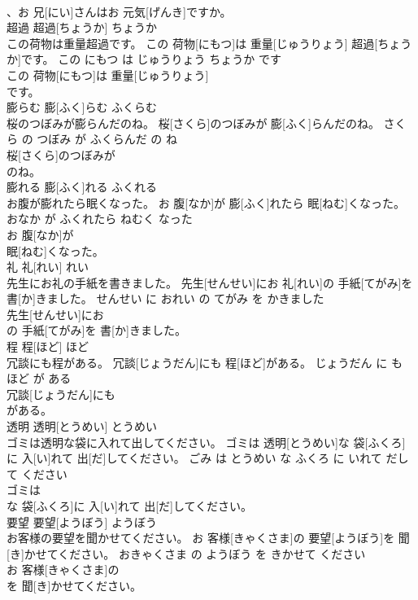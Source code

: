 \documentclass[8pt]{extreport}
\begin{document}
\begin{CJK}{UTF8}{min}
\\	、お 兄[にい]さんはお 元気[げんき]ですか。			
\\	超過	超過[ちょうか]	ちょうか	
\\	この荷物は重量超過です。	この 荷物[にもつ]は 重量[じゅうりょう] 超過[ちょうか]です。	この にもつ は じゅうりょう ちょうか です	
\\	この 荷物[にもつ]は 重量[じゅうりょう]
\\	です。			
\\	膨らむ	膨[ふく]らむ	ふくらむ	
\\	桜のつぼみが膨らんだのね。	桜[さくら]のつぼみが 膨[ふく]らんだのね。	さくら の つぼみ が ふくらんだ の ね	
\\	桜[さくら]のつぼみが
\\	のね。			
\\	膨れる	膨[ふく]れる	ふくれる	
\\	お腹が膨れたら眠くなった。	お 腹[なか]が 膨[ふく]れたら 眠[ねむ]くなった。	おなか が ふくれたら ねむく なった	
\\	お 腹[なか]が
\\	眠[ねむ]くなった。			
\\	礼	礼[れい]	れい	
\\	先生にお礼の手紙を書きました。	先生[せんせい]にお 礼[れい]の 手紙[てがみ]を 書[か]きました。	せんせい に おれい の てがみ を かきました	
\\	先生[せんせい]にお
\\	の 手紙[てがみ]を 書[か]きました。			
\\	程	程[ほど]	ほど	
\\	冗談にも程がある。	冗談[じょうだん]にも 程[ほど]がある。	じょうだん に も ほど が ある	
\\	冗談[じょうだん]にも
\\	がある。			
\\	透明	透明[とうめい]	とうめい	
\\	ゴミは透明な袋に入れて出してください。	ゴミは 透明[とうめい]な 袋[ふくろ]に 入[い]れて 出[だ]してください。	ごみ は とうめい な ふくろ に いれて だして ください	
\\	ゴミは
\\	な 袋[ふくろ]に 入[い]れて 出[だ]してください。			
\\	要望	要望[ようぼう]	ようぼう	
\\	お客様の要望を聞かせてください。	お 客様[きゃくさま]の 要望[ようぼう]を 聞[き]かせてください。	おきゃくさま の ようぼう を きかせて ください	
\\	お 客様[きゃくさま]の
\\	を 聞[き]かせてください。			

\end{CJK}
\end{document}
